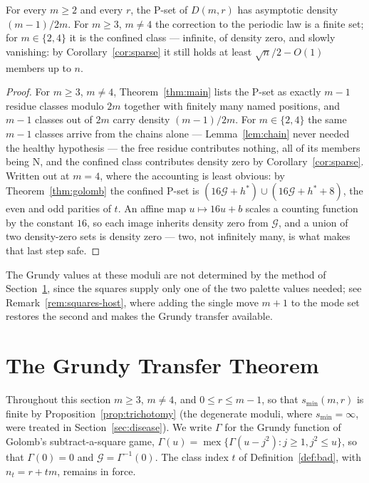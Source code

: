 \begin{corollary}\label{cor:uniform}
For every $m \ge 2$ and every $r$, the P-set of $D(m,r)$ has asymptotic
density $(m-1)/2m$. For $m \ge 3$, $m \ne 4$ the correction to the
periodic law is a finite set; for $m \in \{2, 4\}$ it is the confined
class --- infinite, of density zero, and slowly vanishing: by
Corollary~\ref{cor:sparse} it still holds at least $\sqrt{n}/2 - O(1)$
members up to $n$.
\end{corollary}
\begin{proof}
For $m \ge 3$, $m \ne 4$, Theorem~\ref{thm:main} lists the P-set as
exactly $m - 1$ residue classes modulo $2m$ together with finitely many
named positions, and $m - 1$ classes out of $2m$ carry density
$(m-1)/2m$. For $m \in \{2, 4\}$ the same $m - 1$ classes arrive from
the chains alone --- Lemma~\ref{lem:chain} never needed the healthy
hypothesis --- the free residue contributes nothing, all of its members
being N, and the confined class contributes density zero by
Corollary~\ref{cor:sparse}. Written out at $m = 4$, where the accounting
is least obvious: by Theorem~\ref{thm:golomb} the confined P-set is
$(16\mathcal{G} + h^*) \cup (16\mathcal{G} + h^* + 8)$, the even and odd parities of $t$. An
affine map $u \mapsto 16u + b$ scales a counting function by the
constant $16$, so each image inherits density zero from $\mathcal{G}$, and a union
of two density-zero sets is density zero --- two, not infinitely many,
is what makes that last step safe.
\end{proof}

The Grundy values at these moduli are not determined by the method of
Section~\ref{sec:grundy}, since the squares supply only one of the two
palette values needed; see Remark~\ref{rem:squares-host}, where adding
the single move $m+1$ to the mode set restores the second and makes the
Grundy transfer available.

\section{The Grundy Transfer Theorem}\label{sec:grundy}

Throughout this section $m \ge 3$, $m \ne 4$, and $0 \le r \le m-1$, so
that $s_{\min}(m,r)$ is finite by Proposition~\ref{prop:trichotomy} (the
degenerate moduli, where $s_{\min} = \infty$, were treated in
Section~\ref{sec:disease}). We write $\Gamma$ for the Grundy function of
Golomb's subtract-a-square game,
$\Gamma(u) = \operatorname{mex}\{\Gamma(u - j^2) : j \ge 1, j^2 \le u\}$,
so that $\Gamma(0) = 0$ and $\mathcal{G} = \Gamma^{-1}(0)$. The class
index $t$ of Definition~\ref{def:bad}, with $n_t = r + tm$, remains in
force.

